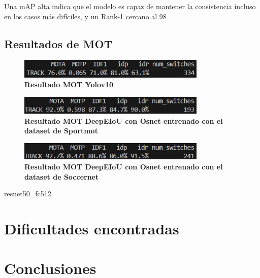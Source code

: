 \documentclass[12pt, a4paper, twoside]{article}
\begin{document}
 	Una mAP alta indica que el modelo es capaz de mantener la consistencia incluso en los casos más difíciles, y un Rank-1 cercano al 98%
 	
 	\subsection{Resultados de MOT}
	
	\begin{figure}[H]
		\centering
		\includegraphics[width=0.8\textwidth]{image/metricas_mot_yolo10}
		\caption{\textbf{Resultado MOT Yolov10}}
		\label{fig:Resultado Yolov10 mot}
	\end{figure}
	
	\begin{figure}[H]
		\centering
		\includegraphics[width=0.8\textwidth]{image/metricas_mot_deepEIoU_osnet_sportmot}
		\caption{\textbf{Resultado MOT DeepEIoU con Osnet entrenado con el dataset de Sportmot}}
		\label{fig:Resultado DeepEIoU con Osnet mot sportmot}
	\end{figure}
	
	\begin{figure}[H]
		\centering
		\includegraphics[width=0.8\textwidth]{image/metricas_mot_deepEIoU_osnet_soccernet}
		\caption{\textbf{Resultado MOT DeepEIoU con Osnet entrenado con el dataset de Soccernet}}
		\label{fig:Resultado DeepEIoU con Osnet mot soccernet}
	\end{figure}
	
	resnet50\_fc512
	
	\section{Dificultades encontradas}
	
	
	
	\section{Conclusiones}
	
	
	
	\printbibliography
	
	
	
	
\end{document}

